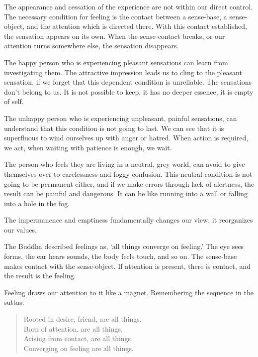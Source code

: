 \clearpage

The appearance and cessation of the experience are not within our direct
control. The necessary condition for feeling is the contact between a
sense-base, a sense-object, and the attention which is directed there.
With this contact established, the sensation appears on its own. When
the sense-contact breaks, or our attention turns somewhere else, the
sensation disappears.

The happy person who is experiencing pleasant sensations can learn from
investigating them. The attractive impression leads us to cling to the
pleasant sensation, if we forget that this dependent condition is
unreliable. The sensations don't belong to us. It is not possible to
keep, it has no deeper essence, it is empty of self.

The unhappy person who is experiencing unpleasant, painful sensations,
can understand that this condition is not going to last. We can see that
it is superfluous to wind ourselves up with anger or hatred. When action
is required, we act, when waiting with patience is enough, we wait.

The person who feels they are living in a neutral, grey world, can avoid
to give themselves over to carelessness and foggy confusion. This
neutral condition is not going to be permanent either, and if we make
errors through lack of alertness, the result can be painful and
dangerous. It can be like running into a wall or falling into a hole in
the fog.

The impermanence and emptiness fundamentally changes our view, it
reorganizes our values.

The Buddha described feelings as, `all things converge on feeling.' The
eye sees forms, the ear hears sounds, the body feels touch, and so on.
The sense-base makes contact with the sense-object. If attention is
present, there is contact, and the result is the feeling.

Feeling draws our attention to it like a magnet. Remembering the
sequence in the suttas:

\begin{quote}
Rooted in desire, friend, are all things.\\
Born of attention, are all things.\\
Arising from contact, are all things.\\
Converging on feeling are all things.

\bigskip

\end{quote}

